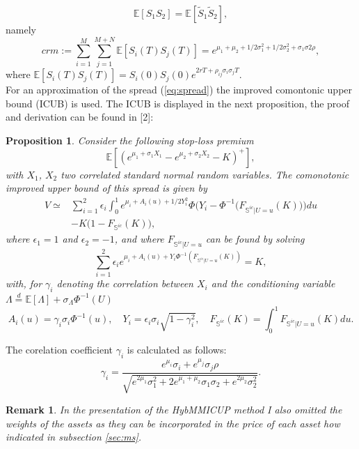 \documentclass[a4paper]{article}
\newtheorem{prop}{Proposition}
\newtheorem*{remark}{Remark}
\begin{document}
$$\mathbb{E}[S_1S_2] = \mathbb{E}[\tilde{S}_1\tilde{S}_2],$$
namely
\begin{equation}
crm:=\sum_{i=1}^{M}\sum_{j=1}^{M+N}\mathbb{E}[S_i(T)S_j(T)]=e^{\mu_1+\mu_2+1/2\sigma_1^2+1/2\sigma_2^2+\sigma_1\sigma2\rho},
\end{equation}
where $\mathbb{E}[S_i(T)S_j(T)] = S_i(0) S_j(0) e^{2rT+\rho_{ij}\sigma_i\sigma_jT}.$\\
For an approximation of the spread (\ref{eq:spread}) the improved comontonic upper bound (ICUB) is used. The ICUB is displayed in the next proposition, the proof and derivation can be found in [2]:
\begin{prop}
Consider the following stop-loss premium
$$\mathbb{E}[(e^{\mu_1+\sigma_1X_1}-e^{\mu_2+\sigma_2X_2}-K)^+],$$
with $X_1$, $X_2$ two correlated standard normal random variables. The comonotonic improved upper bound of this spread is given by
\begin{equation}
\label{eq:ints}
\begin{split}
V \simeq &\sum_{i=1}^2\epsilon_i\int_0^1e^{\mu_i+A_i(u)+1/2Y_i^2}\Phi\big(Y_i-\Phi^{-1}\big(F_{\mathbb{S}^{ic}|U=u}(K)\big)\big)du\\
	&-K\big(1-F_{\mathbb{S}^{ic}}(K)\big),
\end{split}
\end{equation}
where $\epsilon_1=1$ and $\epsilon_2=-1$, and where $F_{\mathbb{S}^{ic}|U=u}$ can be found by solving
\begin{equation}
\label{eq:fzero}
\sum_{i=1}^2\epsilon_ie^{\mu_i+A_i(u)+Y_i\Phi^{-1}(F_{\mathbb{S}^{ic}|U=u}(K))}=K,
\end{equation}
with, for $\gamma_i$ denoting the correlation between $X_i$ and the conditioning variable $\Lambda \stackrel{d}{=} \mathbb{E}[\Lambda]+\sigma_{\Lambda}\Phi^{-1}(U)$
\begin{equation*}
A_i(u)=\gamma_i\sigma_i\Phi^{-1}(u),\quad Y_i=\epsilon_i\sigma_i\sqrt{1-\gamma_i^2}, \quad F_{\mathbb{S}^{ic}}(K) = \int_0^1F_{\mathbb{S}^{ic}|U=u}(K)du.
\end{equation*}
\end{prop}
The corelation coefficient $\gamma_i$ is calculated as follows:
$$\gamma_i = \frac{e^{\mu_i}\sigma_i+e^{\mu_j}\sigma_j\rho}{\sqrt{e^{2\mu_1}\sigma_1^2+2e^{\mu_1+\mu_2}\sigma_1\sigma_2+e^{2\mu_2}\sigma_2^2}}.$$
\begin{remark}
In the presentation of the HybMMICUP method I also omitted the weights of the assets as they can be incorporated in the price of each asset how indicated in subsection \ref{sec:ms}.
\end{remark}
\end{document}
